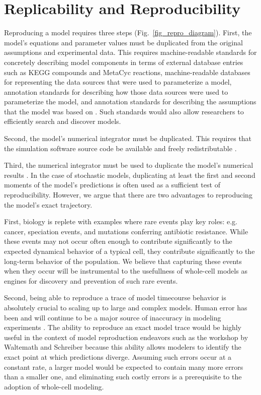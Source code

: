\documentclass[journal,transmag,twoside]{IEEEtran}
\begin{document}
\section{Replicability and Reproducibility}
Reproducing a model requires three steps (Fig.~\ref{fig_repro_diagram}). First, the model's equations and parameter values must be duplicated from the original assumptions and experimental data. This requires machine-readable standards for concretely describing model components in terms of external database entries such as KEGG \cite{kanehisa2000kegg} compounds and MetaCyc \cite{caspi2008metacyc} reactions, machine-readable databases for representing the data sources that were used to parameterize a model, annotation standards for describing how those data sources were used to parameterize the model, and annotation standards for describing the assumptions that the model was based on \cite{boulton2012open}. Such standards would also allow researchers to efficiently search and discover models.

Second, the model's numerical integrator must be duplicated. This requires that the simulation software source code be available and freely redistributable \cite{easterbrook2014open}.

Third, the numerical integrator must be used to duplicate the model's numerical results \cite{easterbrook2014open}. In the case of stochastic models, duplicating at least the first and second moments of the model's predictions is often used as a sufficient test of reproducibility. However, we argue that there are two advantages to reproducing the model's exact trajectory.

First, biology is replete with examples where rare events play key roles: e.g. cancer, speciation events, and mutations conferring antibiotic resistance. While these events may not occur often enough to contribute significantly to the expected dynamical behavior of a typical cell, they contribute significantly to the long-term behavior of the population. We believe that capturing these events when they occur will be instrumental to the usefullness of whole-cell models as engines for discovery and prevention of such rare events.

Second, being able to reproduce a trace of model timecourse behavior is absolutely crucial to scaling up to large and complex models. Human error has been and will continue to be a major source of inaccuracy in modeling experiments \cite{ebrahim2015genome}. The ability to reproduce an exact model trace would be highly useful in the context of model reproduction endeavors such as the workshop by Waltemath and Schreiber because this ability allows modelers to identify the exact point at which predictions diverge. Assuming such errors occur at a constant rate, a larger model would be expected to contain many more errors than a smaller one, and eliminating such costly errors is a prerequisite to the adoption of whole-cell modeling.
\end{document}

